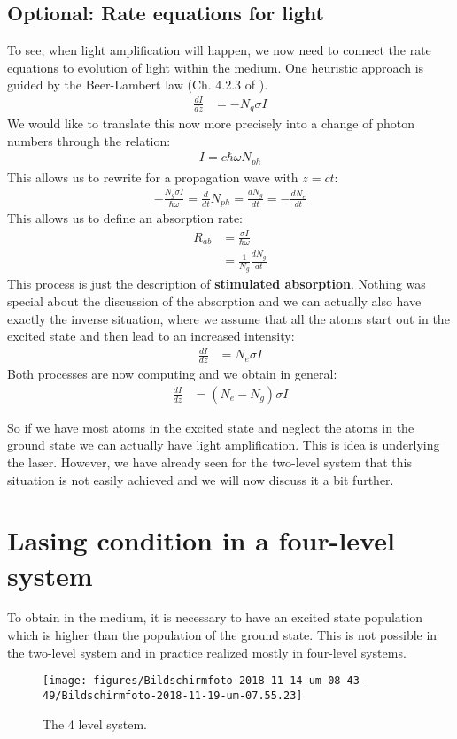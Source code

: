 \documentclass[10pt]{article}
\let\cite\citep
\providecommand\citep{\cite}
\begin{document}
\subsection{Optional: Rate equations for light}
To see, when light amplification will happen, we now need to connect the rate equations to evolution of light within the medium. One heuristic approach is guided by the Beer-Lambert law (Ch. 4.2.3 of \cite{Hertel_2015}).
\begin{align}
\frac{dI}{dz}&=- N_g\sigma I
\end{align}
We would like to translate this now more precisely into a change of photon numbers through the relation:
\begin{align}
I = c \hbar\omega N_{ph}
\end{align}
This allows us to rewrite for a propagation wave with $z = ct $:
\begin{align}
- \frac{N_g\sigma I}{\hbar \omega} = \frac{d}{dt}N_{ph} = \frac{dN_g}{dt} = -\frac{dN_e}{dt}
\end{align}
This allows us to define an absorption rate:
\begin{align}
R_{ab} &=  \frac{\sigma I}{\hbar \omega}\\
&= \frac{1}{N_g}\frac{dN_g}{dt}
\end{align}
This process is just the description of \textbf{stimulated absorption}. Nothing was special about the discussion of the absorption and we can actually also have exactly the inverse situation, where we assume that all the atoms start out in the excited state and then lead to an increased intensity:
\begin{align}
\frac{dI}{dz}&= N_e\sigma I
\end{align}
Both processes are now computing and we obtain in general:
\begin{align}
\frac{dI}{dz}&= (N_e-N_g)\sigma I
\end{align}

So if we have most atoms in the excited state and neglect the atoms in the ground state we can actually have light amplification. This is idea is underlying the laser. However, we have already seen for the two-level system that this situation is not easily achieved and we will now discuss it a bit further.




\section{Lasing condition in a four-level system}
To obtain in the medium, it is necessary to have an excited state population which is higher than the population of the ground state. This is not possible in the two-level system and in practice realized mostly in four-level systems.
\begin{figure}[h!]
\begin{center}
\texttt{[image: figures/Bildschirmfoto-2018-11-14-um-08-43-49/Bildschirmfoto-2018-11-19-um-07.55.23]}
\caption{{The 4 level system.
{\label{804096}}%
}}
\end{center}
\end{figure}
\end{document}
